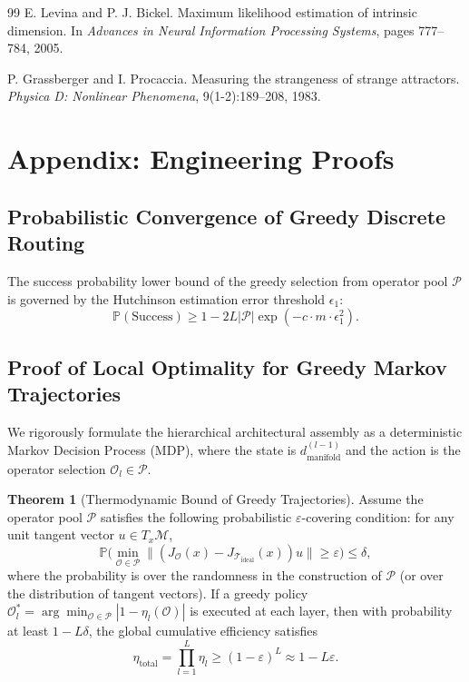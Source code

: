 \documentclass[11pt, a4paper]{article}
\theoremstyle{definition}
\newtheorem{theorem}{Theorem}[section]
\begin{document}
\begin{thebibliography}{99}
E. Levina and P. J. Bickel.
\newblock Maximum likelihood estimation of intrinsic dimension.
\newblock In \emph{Advances in Neural Information Processing Systems}, pages 777--784, 2005.

P. Grassberger and I. Procaccia.
\newblock Measuring the strangeness of strange attractors.
\newblock \emph{Physica D: Nonlinear Phenomena}, 9(1-2):189--208, 1983.

\end{thebibliography}

\appendix
\section{Appendix: Engineering Proofs}
\label{app:proofs}

\subsection{Probabilistic Convergence of Greedy Discrete Routing}
\label{app:proof-path3}
The success probability lower bound of the greedy selection from operator pool $\mathcal{P}$ is governed by the Hutchinson estimation error threshold $\epsilon_1$:
\begin{equation}
    \mathbb{P}(\text{Success}) \ge 1 - 2L|\mathcal{P}|\exp\left(-c \cdot m \cdot \epsilon_1^2\right).
\end{equation}

\subsection{Proof of Local Optimality for Greedy Markov Trajectories}
\label{app:proof-markov-optimality}

We rigorously formulate the hierarchical architectural assembly as a deterministic Markov Decision Process (MDP), where the state is $d_{\text{manifold}}^{(l-1)}$ and the action is the operator selection $\mathcal{O}_l \in \mathcal{P}$.

\begin{theorem}[Thermodynamic Bound of Greedy Trajectories]
\label{thm:greedy-markov-bound}
Assume the operator pool $\mathcal{P}$ satisfies the following probabilistic $\varepsilon$-covering condition: for any unit tangent vector $u \in T_x\mathcal{M}$,
\begin{equation}
\mathbb{P}\Big( \min_{\mathcal{O} \in \mathcal{P}} \| (J_{\mathcal{O}}(x) - J_{\mathcal{T}_{\text{ideal}}}(x)) u \| \ge \varepsilon \Big) \le \delta,
\end{equation}
where the probability is over the randomness in the construction of $\mathcal{P}$ (or over the distribution of tangent vectors). If a greedy policy $\mathcal{O}_l^* = \arg\min_{\mathcal{O} \in \mathcal{P}} |1 - \eta_l(\mathcal{O})|$ is executed at each layer, then with probability at least $1 - L\delta$, the global cumulative efficiency satisfies
\begin{equation}
\eta_{\text{total}} = \prod_{l=1}^L \eta_l \ge (1 - \varepsilon)^L \approx 1 - L\varepsilon.
\end{equation}
\end{theorem}
\end{document}
